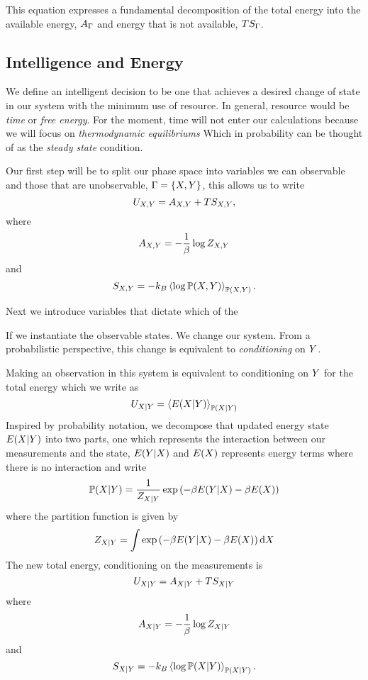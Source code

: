 \documentclass[]{article}
\begin{document}
This equation expresses a fundamental decomposition of the total energy
into the available energy, \(A_\Gamma\) and energy that is not
available, \(TS_\Gamma\).

\subsection{Intelligence and Energy}

We define an intelligent decision to be one that achieves a desired
change of state in our system with the minimum use of resource. In
general, resource would be \emph{time} or \emph{free energy}. For the
moment, time will not enter our calculations because we will focus on
\emph{thermodynamic equilibriums} Which in probability can be thought
of as the \emph{steady state} condition.

Our first step will be to split our phase space into variables we can
observable and those that are unobservable,
\(\Gamma = \{X, Y\}\), this allows
us to write 
\[
U_{X,Y} = A_{X,Y} + TS_{X,Y},
\] 
where 
\[
A_{X,Y} = - \frac{1}{\beta}\log Z_{X,Y}
\] 
and 
\[
S_{X,Y} = -k_B \left\langle \log \mathbb{P}({X,Y}) \right\rangle_{\mathbb{P}({X,Y})}.
\]

Next we introduce variables that dictate which of the 

If we instantiate the observable states. We change our system. From a
probabilistic perspective, this change is equivalent to
\emph{conditioning} on \(Y\).

Making an observation in this system is equivalent to conditioning on
\(Y\) for the total energy which we write as 
\[
U_{X|Y} = \left\langle E({X|Y}) \right\rangle_{\mathbb{P}({X|Y})}
\] 
Inspired by probability notation, we decompose that updated energy
state \(E(X| Y)\) into two parts, one which
represents the interaction between our measurements and the state,
\(E(Y|X)\) and \(E(X)\)
represents energy terms where there is no interaction and write 
\[
\mathbb{P}({X|Y}) = \frac{1}{Z_{X|Y}} \exp\left(-\beta E(Y|X) -\beta E(X)\right)
\] 
where the partition function is given by 
\[
Z_{X|Y} = \int \exp\left(-\beta E(Y|X) -\beta E(X)\right) \text{d}X
\] 
The new total energy, conditioning on the measurements is 
\[
U_{X|Y} = A_{X|Y} + TS_{X|Y}
\] 
where 
\[
A_{X|Y} = - \frac{1}{\beta}\log Z_{X|Y}
\] 
and 
\[
S_{X|Y} = -k_B \left\langle \log \mathbb{P}({X|Y}) \right\rangle_{\mathbb{P}({X|Y})}.
\]
\end{document}
